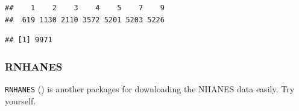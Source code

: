 \documentclass[
]{book}
\newenvironment{Shaded}{\begin{snugshade}}{\end{snugshade}}
\newcommand{\KeywordTok}[1]{\textcolor[rgb]{0.13,0.29,0.53}{\textbf{#1}}}
\newcommand{\NormalTok}[1]{#1}
\newcommand{\OperatorTok}[1]{\textcolor[rgb]{0.81,0.36,0.00}{\textbf{#1}}}
\begin{document}
\begin{verbatim}
##    1    2    3    4    5    7    9 
##  619 1130 2110 3572 5201 5203 5226
\end{verbatim}

\begin{Shaded}
\end{Shaded}

\begin{verbatim}
## [1] 9971
\end{verbatim}

\hypertarget{rnhanes}{%
\subsubsection{RNHANES}\label{rnhanes}}

\texttt{RNHANES} (\citet{RNHANES}) is another packages for downloading the NHANES data easily. Try yourself.

  
\end{document}
